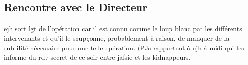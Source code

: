 \subsection{Rencontre avec le Directeur}



\paragraph{} \gls{ejh} sort \gls{lgt} de l'opération car il est connu comme le loup blanc par les différents intervenants et 
qu'il le soupçonne, probablement à raison, de manquer de la subtilité nécessaire pour une telle opération. (PJs rapportent à 
\gls{ejh} à midi qui les informe du rdv secret de ce soir entre \gls{jafsie} et les kidnappeurs.


